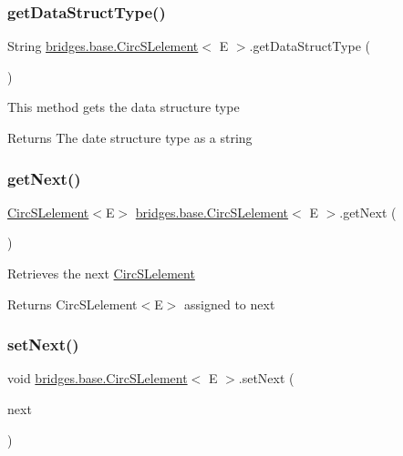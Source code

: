 \subsubsection{\texorpdfstring{get\+Data\+Struct\+Type()}{getDataStructType()}}
{\footnotesize\ttfamily String \hyperlink{classbridges_1_1base_1_1_circ_s_lelement}{bridges.\+base.\+Circ\+S\+Lelement}$<$ E $>$.get\+Data\+Struct\+Type (\begin{DoxyParamCaption}{ }\end{DoxyParamCaption})}

This method gets the data structure type

\begin{DoxyReturn}{Returns}
The date structure type as a string 
\end{DoxyReturn}
\hypertarget{classbridges_1_1base_1_1_circ_s_lelement_ae18b07e3f1d37b5eca0cae22efc0d395}{}\label{classbridges_1_1base_1_1_circ_s_lelement_ae18b07e3f1d37b5eca0cae22efc0d395} 
\subsubsection{\texorpdfstring{get\+Next()}{getNext()}}
{\footnotesize\ttfamily \hyperlink{classbridges_1_1base_1_1_circ_s_lelement}{Circ\+S\+Lelement}$<$E$>$ \hyperlink{classbridges_1_1base_1_1_circ_s_lelement}{bridges.\+base.\+Circ\+S\+Lelement}$<$ E $>$.get\+Next (\begin{DoxyParamCaption}{ }\end{DoxyParamCaption})}

Retrieves the next \hyperlink{classbridges_1_1base_1_1_circ_s_lelement}{Circ\+S\+Lelement} \begin{DoxyReturn}{Returns}
Circ\+S\+Lelement$<$\+E$>$ assigned to next 
\end{DoxyReturn}
\hypertarget{classbridges_1_1base_1_1_circ_s_lelement_acb8e78195e80a243d0add9a5d281f01c}{}\label{classbridges_1_1base_1_1_circ_s_lelement_acb8e78195e80a243d0add9a5d281f01c} 
\subsubsection{\texorpdfstring{set\+Next()}{setNext()}}
{\footnotesize\ttfamily void \hyperlink{classbridges_1_1base_1_1_circ_s_lelement}{bridges.\+base.\+Circ\+S\+Lelement}$<$ E $>$.set\+Next (\begin{DoxyParamCaption}\item[{\hyperlink{classbridges_1_1base_1_1_circ_s_lelement}{Circ\+S\+Lelement}$<$ E $>$}]{next }\end{DoxyParamCaption})}

